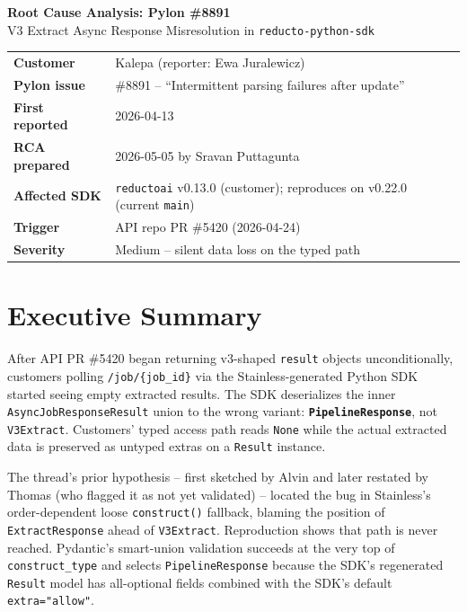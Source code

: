 \documentclass[11pt]{article}
\begin{document}
\begin{flushleft}
{\LARGE\bfseries Root Cause Analysis: Pylon \#8891}\\[2pt]
{\large V3 Extract Async Response Misresolution in \texttt{reducto-python-sdk}}
\end{flushleft}

\vspace{4pt}
\begin{tabular}{@{}ll@{}}
\textbf{Customer}        & Kalepa (reporter: Ewa Juralewicz) \\
\textbf{Pylon issue}     & \#8891 -- ``Intermittent parsing failures after update'' \\
\textbf{First reported}  & 2026-04-13 \\
\textbf{RCA prepared}    & 2026-05-05 by Sravan Puttagunta \\
\textbf{Affected SDK}    & \texttt{reductoai} v0.13.0 (customer); reproduces on v0.22.0 (current \texttt{main}) \\
\textbf{Trigger}         & API repo PR \#5420 (2026-04-24) \\
\textbf{Severity}        & Medium -- silent data loss on the typed path \\
\end{tabular}

\section{Executive Summary}

After API PR \#5420 began returning v3-shaped \texttt{result} objects unconditionally, customers polling \texttt{/job/\{job\_id\}} via the Stainless-generated Python SDK started seeing empty extracted results. The SDK deserializes the inner \texttt{AsyncJobResponseResult} union to the wrong variant: \textbf{\texttt{PipelineResponse}}, not \texttt{V3Extract}. Customers' typed access path reads \texttt{None} while the actual extracted data is preserved as untyped extras on a \texttt{Result} instance.

The thread's prior hypothesis -- first sketched by Alvin and later restated by Thomas (who flagged it as not yet validated) -- located the bug in Stainless's order-dependent loose \texttt{construct()} fallback, blaming the position of \texttt{ExtractResponse} ahead of \texttt{V3Extract}. Reproduction shows that path is never reached. Pydantic's smart-union validation succeeds at the very top of \texttt{construct\_type} and selects \texttt{PipelineResponse} because the SDK's regenerated \texttt{Result} model has all-optional fields combined with the SDK's default \texttt{extra="allow"}.
\end{document}

